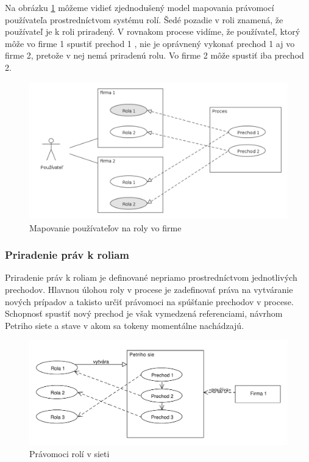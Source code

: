  Na obrázku  \ref{fig:user_to_roles} môžeme vidieť zjednodušený model mapovania právomocí používateľa prostredníctvom systému rolí.
Šedé pozadie v roli znamená, že používateľ je k roli priradený.  V rovnakom procese vidíme, že používateľ, ktorý môže vo firme 1 spustiť prechod 1 , nie je oprávnený vykonať prechod 1 aj vo firme 2, pretože v nej nemá priradenú rolu. Vo firme 2 môže spustiť iba prechod 2.

\begin{figure}[h]
	\centering
	\includegraphics[width=0.9\linewidth]{images/user_to_roles}
	\caption{ Mapovanie používateľov na roly vo firme}
	\label{fig:user_to_roles}
\end{figure}





\subsubsection{Priradenie práv k roliam}
Priradenie práv k roliam je definované nepriamo prostredníctvom jednotlivých prechodov. Hlavnou úlohou roly v procese je zadefinovať práva na vytváranie nových prípadov a takisto určiť právomoci na spúšťanie prechodov v procese. Schopnosť spustiť nový prechod je však vymedzená referenciami, návrhom Petriho siete a stave v akom sa tokeny momentálne nachádzajú.  


\begin{figure}[h]
	\centering
	\includegraphics[width=0.9\linewidth]{images/roles_permissions}
	\caption{ Právomoci rolí v sieti }
	\label{fig:roles_permissions}
\end{figure}

